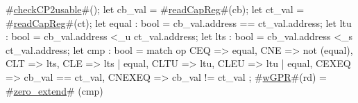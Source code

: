 #\hyperref[sailMIPSzcheckCP2usable]{checkCP2usable}#();
let cb_val = #\hyperref[sailMIPSzreadCapReg]{readCapReg}#(cb);
let ct_val = #\hyperref[sailMIPSzreadCapReg]{readCapReg}#(ct);
let equal : bool = cb_val.address == ct_val.address;
let ltu : bool = cb_val.address <_u ct_val.address;
let lts : bool = cb_val.address <_s ct_val.address;
let cmp : bool = match op {
  CEQ    => equal,
  CNE    => not (equal),
  CLT    => lts,
  CLE    => lts | equal,
  CLTU   => ltu,
  CLEU   => ltu | equal,
  CEXEQ  => cb_val == ct_val,
  CNEXEQ => cb_val != ct_val
};
#\hyperref[sailMIPSzwGPR]{wGPR}#(rd) = #\hyperref[sailMIPSzzzerozyextend]{zero\_extend}# (cmp)
